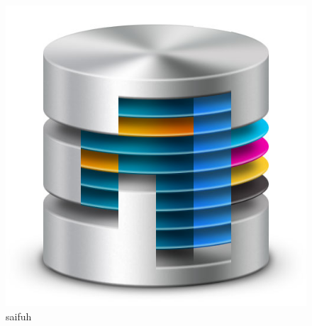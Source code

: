 

       \rhead{\today}

\lfoot{}            \cfoot{}                \rfoot{\thepage}


    
    

    \begin{figure}[h]
        \centering
        \includegraphics[width=0.7\linewidth]{figs/titlepagefig}
        \caption[sidfuh]{saifuh}
        \label{fig:titlepagefig}
    \end{figure}


